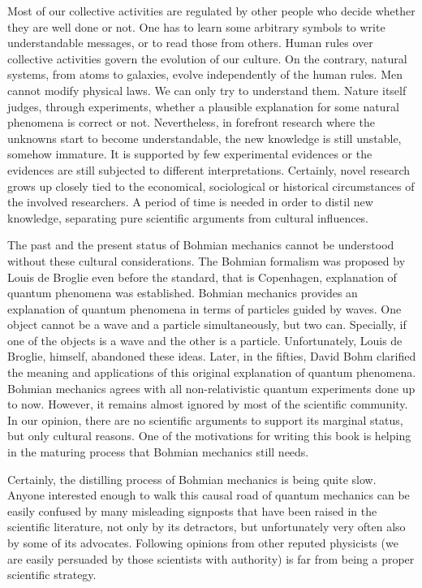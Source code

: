 \documentclass[nofootinbib, secnumarabic, amsmath, nobibnotes,10pt,aps,pra]{revtex4-1}
\begin{document}
Most of our collective activities are regulated by other people who decide whether they are well done or not. One has to learn some arbitrary symbols to write understandable messages, or to read those from others. Human rules over collective activities govern the evolution of our culture. On the contrary, natural systems, from atoms to galaxies, evolve independently of the human rules. Men cannot modify physical laws. We can only try to understand them. Nature itself judges, through experiments, whether a plausible explanation for some natural phenomena is correct or not. Nevertheless, in forefront research where the unknowns start to become understandable, the new knowledge is still unstable, somehow immature. It is supported by few experimental evidences or the evidences are still subjected to different interpretations. Certainly, novel research grows up closely tied to the economical, sociological or historical circumstances of the involved researchers.  A period of time is needed in order to distil new knowledge, separating pure scientific arguments from cultural influences.

The past and the present status of Bohmian mechanics cannot be understood without these cultural considerations. The Bohmian formalism was proposed by Louis de Broglie even before the standard, that is Copenhagen, explanation of quantum phenomena was established.
Bohmian mechanics provides an explanation of quantum phenomena in terms of particles guided by waves.
One object cannot be a wave and a particle simultaneously, but two can. Specially, if one of the objects is a wave and the other is a particle. 
Unfortunately, Louis de Broglie, himself, abandoned these ideas. Later, in the fifties, David Bohm clarified the meaning and applications of this original explanation of quantum phenomena. Bohmian mechanics agrees with all non-relativistic quantum experiments done up to now. However, it remains almost ignored by most of the scientific community. In our opinion, there are no scientific arguments to support its marginal status, but only cultural reasons. One of the motivations for writing this book is helping in the maturing process that Bohmian mechanics still needs.

Certainly, the distilling process of Bohmian mechanics is being quite slow. Anyone interested enough to walk this causal road of quantum mechanics can be easily confused by many misleading signposts that have been raised in the scientific literature, not only by its detractors, but unfortunately very often also by some of its advocates. Following opinions from other reputed physicists (we are easily persuaded by those scientists with authority) is far from being a proper scientific strategy.
\end{document}
